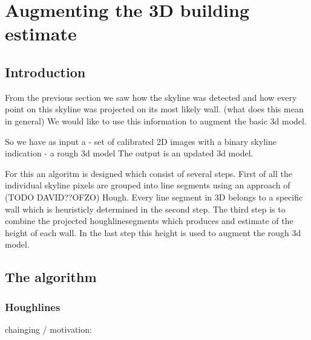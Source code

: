 
\section{Augmenting the 3D building estimate}
\subsection{Introduction}
From the previous section we saw how the skyline was detected and how every point on this skyline was projected on its most likely wall. (what does this mean in general)
We would like to use this information to augment the basic 3d model.

So we have as input a
- set of calibrated 2D images with a binary skyline indication
- a rough 3d model
The output is an updated 3d model.

For this an algoritm is designed which consist of several steps. 
First of all the individual skyline pixels are grouped into line segments using an approach of (TODO DAVID??OFZO) Hough.
Every line segment in 3D belongs to a specific wall which is heuristicly determined in the second step.
The third step is to combine the projected houghlinesegments which produces and estimate of the height of each wall.
In the last step this height is used to augment the rough 3d model.





\subsection{The algorithm}
\subsubsection{Houghlines}
	chainging / motivation:




